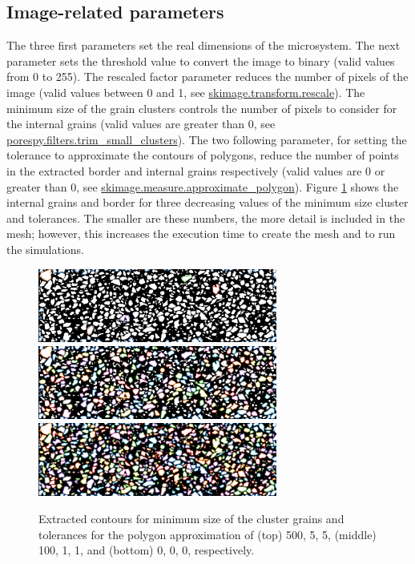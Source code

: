 \documentclass[10pt]{article}
\begin{document}
\subsection{Image-related parameters}
The three first parameters set the real dimensions of the microsystem. The next parameter sets the threshold value to convert the image to binary (valid values from 0 to 255). The rescaled factor parameter reduces the number of pixels of the image (valid values between 0 and 1, see \href{https://scikit-image.org/docs/stable/api/skimage.transform.html#skimage.transform.rescale}{skimage.transform.rescale}). The minimum size of the grain clusters controls the number of pixels to consider for the internal grains (valid values are greater than 0, see \href{https://porespy.org/modules/generated/porespy.filters.trim\_small\_clusters.html}{porespy.filters.trim\_small\_clusters}). The two following parameter, for setting the tolerance to approximate the contours of polygons, reduce the number of points in the extracted border and internal grains respectively (valid values are 0 or greater than 0, see  \href{https://scikit-image.org/docs/stable/auto\_examples/edges/plot\_polygon.html}{skimage.measure.approximate\_polygon}). Figure \ref{sizes} shows the internal grains and border for three decreasing values of the minimum size cluster and tolerances. The smaller are these numbers, the more detail is included in the mesh; however, this increases the execution time to create the mesh and to run the simulations. 

\begin{figure}[h!]
\centering
\includegraphics[width=0.7\textwidth]{size_500_5_5.png}
\includegraphics[width=0.7\textwidth]{size_100_1_1.png}
\includegraphics[width=0.7\textwidth]{size_0_0_0.png}
\caption{Extracted contours for minimum size of the cluster grains and tolerances for the polygon approximation of (top) 500, 5, 5, (middle) 100, 1, 1, and (bottom) 0, 0, 0, respectively.}
\label{sizes} 
\end{figure}
\end{document}
